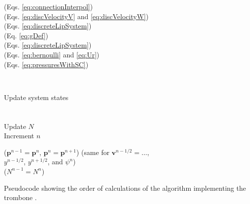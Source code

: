 \begin{algorithm}[ht]
{{{\begin{minipage}[c]{0.43\linewidth}
                (Eqs. \eqref{eq:connectionInterpol})\vspace{0.05em}\\
                (Eqs. \eqref{eq:discVelocityV} and \eqref{eq:discVelocityW})\\
                (Eqs. \eqref{eq:discreteLipSystem})\\
                (Eq. \eqref{eq:gDef})\\
                (Eqs. \eqref{eq:discreteLipSystem})\\
                (Eqs. \eqref{eq:bernoulli} and \eqref{eq:Ur})\\
                (Eqs. \eqref{eq:pressuresWithSC})
                \vspace{0.25em}\\
           \end{minipage}
           \\
           \begin{minipage}[c]{0.4\linewidth}
                Update system states\\
                \\
                \\
                Update $N$ \\
                Increment $n$      
            \end{minipage}
            \begin{minipage}[c]{0.5\linewidth}
                ($\mathbf{p}^{n-1} = \mathbf{p}^{n}$, $\mathbf{p}^n=\mathbf{p}^{n+1}$)
                (same for $\mathbf{v}^{n-1/2} = \hdots$,\\
                $y^{n-1/2}$, $y^{n+1/2}$, and $\psi^n$)\\
                ($N^{n-1} = N^n$)\\
            \end{minipage}
            }
        }
    }
    \vspace{0.12cm}
    \caption{Pseudocode showing the order of calculations of the algorithm implementing the trombone .\label{alg:calcOrder}}
\end{algorithm}

